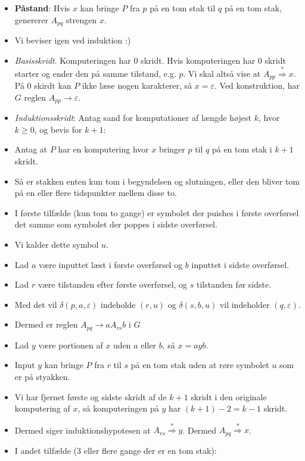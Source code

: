 \begin{frame}[allowframebreaks]
\begin{itemize}
		\item \textbf{Påstand}: Hvis $x$ kan bringe $P$ fra $p$ på en tom stak til $q$ på en tom stak, genererer $A_{pq}$ strengen $x$.
		\item Vi beviser igen ved induktion :)
		\item \textit{Basisskridt}. Komputeringen har $0$ skridt. Hvis komputeringen har 0 skridt starter og ender den på samme tilstand, e.g. $p$. Vi skal altså vise at $A_{pp} \overset{*}{\Rightarrow} x$. På 0 skirdt kan $P$ ikke læse nogen karakterer, så $x = \varepsilon$. Ved konstruktion, har $G$ reglen $A_{pp} \rightarrow \varepsilon$.
		\item \textit{Induktionsskridt}: Antag sand for komputationer af længde højest $k$, hvor $k \ge 0$, og bevis for $k+1$:
		\item Antag at $P$ har en komputering hvor $x$ bringer $p$ til $q$ på en tom stak i $k+1$ skridt.
		\item Så er stakken enten kun tom i begyndelsen og slutningen, eller den bliver tom på en eller flere tidspunkter mellem disse to.
		\item I første tilfælde (kun tom to gange) er symbolet der puishes i første overførsel det samme som symbolet der poppes i sidste overførsel.
		\item Vi kalder dette symbol $u$.
		\item Lad $a$ være inputtet læst i første overførsel og $b$ inputtet i sidste overførsel.
		\item Lad $r$ være tilstanden efter første overførsel, og $s$ tilstanden før sidste.
		\item Med det vil $\delta(p,a,\varepsilon)$ indeholde $(r,u)$ og $\delta(s,b,u)$ vil indeholder $(q,\varepsilon)$.
		\item Dermed er reglen $A_{pq} \rightarrow aA_{rs}b$ i $G$
		\item Lad $y$ være portionen af $x$ uden $a$ eller $b$, så $x = ayb$.
		\item Input $y$ kan bringe $P$ fra $r$ til $s$ på en tom stak uden at røre symbolet $u$ som er på styakken.
		\item Vi har fjernet første og sidste skridt af de $k+1$ skridt i den originale komputering af $x$, så komputeringen på $y$ har $(k+1)-2 = k-1$ skridt.
		\item Dermed siger induktionshypotesen at $A_{rs} \overset{*}{\Rightarrow} y$. Dermed $A_{pq} \overset{*}{\Rightarrow} x$.
		\item I andet tilfælde (3 eller flere gange der er en tom stak):

\end{itemize}
\end{frame}
